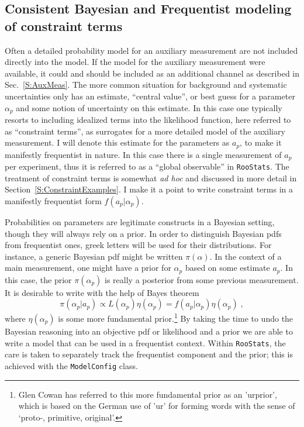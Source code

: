 \documentclass{cernrep}
\def\roostats{\texttt{RooStats}}
\begin{document}


\subsection{Consistent Bayesian and Frequentist modeling of constraint terms}\label{S:Constraint}

Often a detailed probability model for an auxiliary measurement are not included directly into the model.  If the model for the auxiliary measurement were available, it could and should be included as an additional channel as described in Sec.~\ref{S:AuxMeas}.  The more common situation for background  and systematic uncertainties only has an estimate,  ``central value'', or best guess for a parameter $\alpha_p$ and some notion of uncertainty on this estimate.  In this case one typically resorts to including idealized terms into the likelihood function, here referred to as ``constraint terms'', as surrogates for a more detailed model of the auxiliary measurement.   I will denote this estimate for the parameters as $a_p$, to make it manifestly frequentist in nature.  In this case there is a single measurement of $a_p$ per experiment, thus it is referred to as a ``global observable'' in \roostats.  The treatment of constraint terms is somewhat \emph{ad hoc} and discussed in more detail in Section~\ref{S:ConstraintExamples}.  I make it a point to write constraint terms in a manifestly frequentist form $f(a_p | \alpha_p)$.  

Probabilities on parameters are legitimate constructs in a Bayesian setting, though they will always rely on a prior.  In order to distinguish Bayesian pdfs from frequentist ones, greek letters will be used for their distributions.  For instance, a generic Bayesian pdf might be written $\pi(\alpha)$.  In the context of a main measurement, one might have a prior for $\alpha_p$ based on some estimate $a_p$.  In this case, the prior $\pi(\alpha_p )$ is really a posterior from some previous measurement.  It is desirable to write with the help of Bayes theorem
\begin{equation}
\label{eq:urprior}
\pi(\alpha_p | a_p) \propto L( \alpha_p ) \eta(\alpha_p) = f(a_p|\alpha_p) \eta(\alpha_p)\; ,
\end{equation}
where $\eta(\alpha_p)$ is some more fundamental prior.\footnote{Glen Cowan has referred to this more fundamental prior as an 'urprior', which is based on the German use of 'ur' for forming words with the sense of `proto-, primitive, original'.}  By taking the time to undo the Bayesian reasoning into an objective pdf or likelihood and a prior we are able to write a model that can be used in a frequentist context.  Within \roostats, the care is taken to separately track the frequentist component and the prior; this is achieved with the \texttt{ModelConfig} class.
\end{document}
